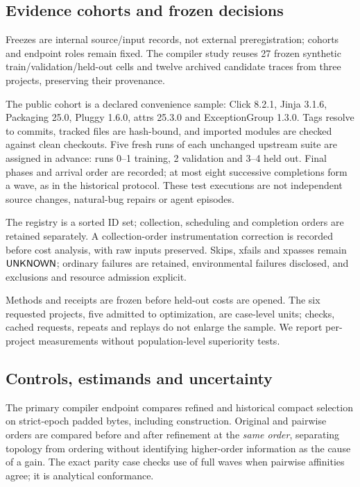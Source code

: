 \documentclass[10pt,journal,compsoc]{IEEEtran}
\theoremstyle{definition}\newtheorem{definition}[theorem]{Definition}
\begin{document}
\subsection{Evidence cohorts and frozen decisions}
Freezes are internal source/input records, not external preregistration;
cohorts and endpoint roles remain fixed. The compiler study reuses 27 frozen
synthetic train/validation/held-out cells and twelve archived candidate traces
from three projects, preserving their provenance.

The public cohort is a declared convenience sample: Click 8.2.1,
Jinja 3.1.6, Packaging 25.0, Pluggy 1.6.0, attrs 25.3.0 and
ExceptionGroup 1.3.0. Tags resolve to commits, tracked files are hash-bound,
and imported modules are checked against clean checkouts. Five fresh runs of
each unchanged upstream suite are assigned in advance: runs 0--1 training,
2 validation and 3--4 held out. Final phases and arrival order are recorded;
at most eight successive completions form a wave, as in the historical protocol.
These test executions are not independent source changes, natural-bug repairs
or agent episodes.

The registry is a sorted ID set; collection, scheduling and completion orders
are retained separately. A collection-order instrumentation correction is
recorded before cost analysis, with raw inputs preserved. Skips, xfails and
xpasses remain $\mathsf{UNKNOWN}$; ordinary failures are retained, environmental
failures disclosed, and exclusions and resource admission explicit.

Methods and receipts are frozen before held-out costs are opened. The six
requested projects, five admitted to optimization, are case-level units;
checks, cached requests, repeats and replays do not enlarge the sample.
We report per-project measurements without population-level superiority tests.

\subsection{Controls, estimands and uncertainty}
The primary compiler endpoint compares refined and historical compact
selection on strict-epoch padded bytes, including construction. Original
and pairwise orders are compared before and after refinement at the
\emph{same order}, separating topology from ordering without identifying
higher-order information as the cause of a gain. The exact parity case checks
use of full waves when pairwise affinities agree; it is analytical conformance.
\end{document}

